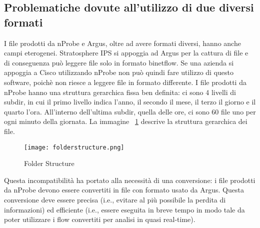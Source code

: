 \documentclass[../main.tex]{subfiles}
\begin{document}
\subsection{Problematiche dovute all'utilizzo di due diversi formati}
I file prodotti da nProbe e Argus, oltre ad avere formati diversi, hanno anche campi eterogenei. Stratosphere IPS si appoggia ad Argus per la cattura di file e di conseguenza può leggere file solo in formato binetflow. 
Se una azienda si appoggia a Cisco utilizzando nProbe non può quindi fare utilizzo di questo software, poichè non riesce a leggere file in formato differente.
I file prodotti da nProbe hanno una struttura gerarchica fissa ben definita: ci sono 4 livelli di subdir, in cui il primo livello indica l'anno, il secondo il mese, il terzo il giorno e il quarto l'ora. All'interno dell'ultima subdir, quella delle ore, ci sono 60 file uno per ogni minuto della giornata.
La immagine ~\ref{fig:folderStructure} descrive la struttura gerarchica dei file.

\begin{figure}[H]
\centering
\texttt{[image: folderstructure.png]}
\caption{Folder Structure}
				\label{fig:folderStructure}
\end{figure}

Questa incompatibilità ha portato alla necessità di una conversione: i file prodotti da nProbe devono essere convertiti in file con formato usato da Argus. Questa conversione deve essere precisa (i.e., evitare al più possibile la perdita di informazioni) ed efficiente (i.e., essere eseguita in breve tempo in modo tale da poter utilizzare i flow convertiti per analisi in quasi real-time).
\end{document}
